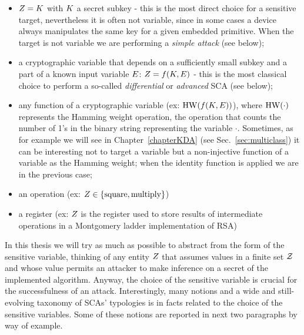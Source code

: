 \begin{itemize}
\item $Z = K$ with $K$ a secret subkey - this is the most direct choice for a sensitive target, nevertheless it is often not variable, since in some cases a device always manipulates the same key for a given embedded primitive. When the target is not variable we are performing a \emph{simple attack} (see below);
\item a cryptographic variable that depends on a sufficiently small subkey and a part of a known input variable $E$: $Z = f(K,E)$ - this is the most classical choice to perform a so-called \emph{differential} or \emph{advanced} SCA (see below);
\item any function of a cryptographic variable (ex: $\mathrm{HW}(f(K,E))$), where $\mathrm{HW}(\cdot)$ represents the Hamming weight operation, \ie the operation that counts the number of 1's in the binary string representing the variable $\cdot$. Sometimes, as for example we will see in Chapter~\ref{chapterKDA} (see Sec.~\ref{sec:multiclass}) it can be interesting not to target a variable but a non-injective function of a variable as the Hamming weight; when the identity function is applied we are in the previous case;
\item an operation (ex: $Z \in \{\mathrm{square}, \mathrm{multiply}\}$)
\item a register (ex: $Z$ is the register used to store results of intermediate operations in a Montgomery ladder implementation of RSA)
\end{itemize}
In this thesis we will try as much as possible to abstract from the form of the sensitive variable, thinking of any entity $Z$ that assumes values in a finite set $\mathcal{Z}$ and whose value permits an attacker to make inference on a secret of the implemented algorithm. Anyway, the choice of the sensitive variable is crucial for the successfulness of an attack. Interestingly, many notions and a wide and still-evolving taxonomy of  SCAs' typologies is in facts related to the choice of the sensitive variables. Some of these notions are reported in next two paragraphs by way of example.

